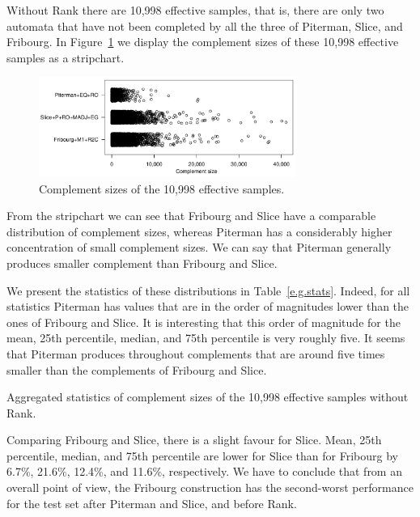 Without Rank there are 10,998 effective samples, that is, there are only two automata that have not been completed by all the three of Piterman, Slice, and Fribourg. In Figure~\ref{e.g.stripchart} we display the complement sizes of these 10,998 effective samples as a stripchart.

\begin{figure}[ht]
\centering
\includegraphics[width=0.75\textwidth]{figures/r/external/goal/s.stripchart.pdf}
\caption{Complement sizes of the 10,998  effective samples.}
\label{e.g.stripchart}
\end{figure}

From the stripchart we can see that Fribourg and Slice have a comparable distribution of complement sizes, whereas Piterman has a considerably higher concentration of small complement sizes. We can say that Piterman generally produces smaller complement than Fribourg and Slice.

We present the statistics of these distributions in Table~\ref{e.g.stats}. 
Indeed, for all statistics Piterman has values that are in the order of magnitudes lower than the ones of Fribourg and Slice. It is interesting that this order of magnitude for the mean, 25th percentile, median, and 75th percentile is very roughly five. It seems that Piterman produces throughout complements that are around five times smaller than the complements of Fribourg and Slice.


\begin{table}[ht]
\centering

\caption{Aggregated statistics of complement sizes of the 10,998 effective samples without Rank.}
\label{e.g.stats}
\end{table}

Comparing Fribourg and Slice, there is a slight favour for Slice. Mean, 25th percentile, median, and 75th percentile are lower for Slice than for Fribourg by 6.7\%, 21.6\%, 12.4\%, and 11.6\%, respectively. We have to conclude that from an overall point of view, the Fribourg construction has the second-worst performance for the \goal{} test set after Piterman and Slice, and before Rank.

